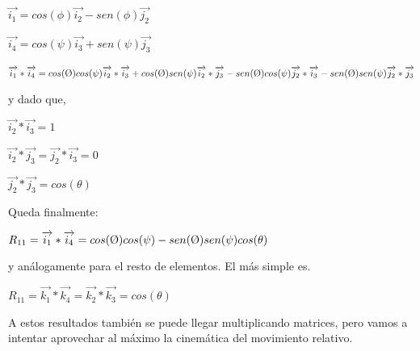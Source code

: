 \documentclass[12pt,a4paper]{report}
\begin{document}
\begin{center}
$\overrightarrow{i_{1}}=cos(\phi)\overrightarrow{i_{2}}-sen(\phi)\overrightarrow{j_{2}}$

$\overrightarrow{i_{4}}=cos(\psi)\overrightarrow{i_{3}}+sen(\psi)\overrightarrow{j_{3}}$

$\overrightarrow{i_{1}}*\overrightarrow{i_{4}}=cos(\textrm \O)cos(\psi)\overrightarrow{i_{2}}*\overrightarrow{i_{3}}+cos(\textrm \O)sen(\psi)\overrightarrow{i_{2}}*\overrightarrow{j_{3}}-sen(\textrm\O)cos(\psi)\overrightarrow{j_{2}}*\overrightarrow{i_{3}}-sen(\textrm \O)sen(\psi)\overrightarrow{j_{2}}*\overrightarrow{j_{3}}$
\end{center}
y dado que,
\begin{center}
$\overrightarrow{i_{2}}*\overrightarrow{i_{3}}=1$

$\overrightarrow{i_{2}}*\overrightarrow{j_{3}}=\overrightarrow{j_{2}}*\overrightarrow{i_{3}}=0$

$\overrightarrow{j_{2}}*\overrightarrow{j_{3}}=cos(\theta)$

Queda finalmente:

$R_{11}=\overrightarrow{i_{1}}*\overrightarrow{i_{4}}=cos(\textrm \O)cos(\psi)-sen(\textrm\O)sen(\psi)cos(\theta)$
\end{center}

y análogamente para el resto de elementos. El más simple es.
\begin{center}
$R_{11}=\overrightarrow{k_{1}}*\overrightarrow{k_{4}}=\overrightarrow{k_{2}}*\overrightarrow{k_{3}}=cos(\theta)$
\end{center}
A estos resultados también se puede llegar multiplicando matrices, pero vamos a intentar aprovechar al máximo la cinemática del movimiento relativo.



\end{document}
